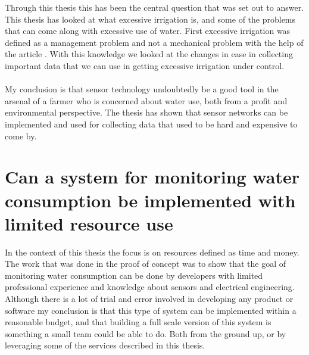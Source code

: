 \documentclass[]{uiophd}
\begin{document}
Through this thesis this has been the central question that was set out to answer. This thesis has looked at what excessive irrigation is, and some of the problems that can come along with excessive use of water. First excessive irrigation was defined as a management problem and not a mechanical problem with the help of the article \cite{LILIENFELD200773}. With this knowledge we looked at the changes in ease in collecting important data that we can use in getting excessive irrigation under control. 
\\\\
My conclusion is that sensor technology undoubtedly be a good tool in the arsenal of a farmer who is concerned about water use, both from a profit and environmental perspective. The thesis has shown that sensor networks can be implemented and used for collecting data that used to be hard and expensive to come by.

\section{ Can a system for monitoring water consumption be implemented with limited resource use}

In the context of this thesis the focus is on resources defined as time and money. The work that was done in the proof of concept was to show that the goal of monitoring water consumption can be done by developers with limited professional experience and knowledge about sensors and electrical engineering. Although there is a lot of trial and error involved in developing any product or software my conclusion is that this type of system can be implemented within a reasonable budget, and that building a full scale version of this system is something a small team could be able to do. Both from the ground up, or by leveraging some of the services described in this thesis.
\end{document}
